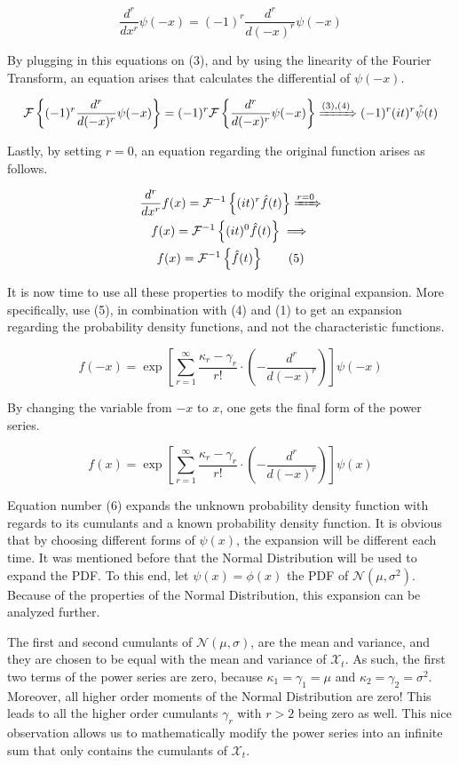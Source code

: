 \[
	\frac{d^r}{dx^r} \psi(-x) = (-1)^r \frac{d^r}{d(-x)^r} \psi(-x)
\]

By plugging in this equations on (3), and by using the linearity of the Fourier Transform, an equation arises that calculates the differential of $\psi(-x)$. 

\[
	\mathcal{F} \left\{ (-1)^r \frac{d^r}{d(-x)^r} \psi(-x) \right\} = (-1)^r \mathcal{F} \left\{ \frac{d^r}{d(-x)^r} \psi(-x) \right\} \xRightarrow{(3),(4)} (-1)^r (it)^r \hat{\psi}(t)
\]

Lastly, by setting $r=0$, an equation regarding the original function arises as follows.

\begin{gather*}
	\frac{d^r}{dx^r} f(x) = \mathcal{F}^{-1} \left\{ (it)^r \hat{f} (t) \right\} \xRightarrow[]{r=0} \\
	f(x) = \mathcal{F}^{-1} \left\{ (it)^0 \hat{f}(t) \right\} \implies \\
	f(x) = \mathcal{F}^{-1} \left\{ \hat{f}(t) \right\} \tag{5}
\end{gather*}

It is now time to use all these properties to modify the original expansion. More specifically, use (5), in combination with (4) and (1) to get an expansion regarding the probability density functions, and not the characteristic functions.

\[
	f(-x) = \exp \left[ \sum_{r=1}^{\infty} \frac{\kappa_{r} - \gamma_{r}}{r!} \cdot \left( - \frac{d^r}{d(-x)^r} \right) \right] \psi(-x)
\]

By changing the variable from $-x$ to $x$, one gets the final form of the power series.

\[
	f(x) = \exp \left[ \sum_{r=1}^{\infty} \frac{\kappa_r - \gamma_r}{r!} \cdot \left( - \frac{d^r}{d(-x)^r} \right) \right] \psi(x) \tag{6}
\]

Equation number (6) expands the unknown probability density function with regards to its cumulants and a known probability density function. It is obvious that by choosing different forms of $\psi(x)$, the expansion will be different each time. It was mentioned before that the Normal Distribution will be used to expand the PDF. To this end, let $\psi(x) = \phi(x)$ the PDF of $\mathcal{N}(\mu, \sigma^2)$. Because of the properties of the Normal Distribution, this expansion can be analyzed further.

\begin{remark}
	The first and second cumulants of $\mathcal{N}(\mu, \sigma)$, are the mean and variance, and they are chosen to be equal with the mean and variance of $\mathcal{X}_t$. As such, the first two terms of the power series are zero, because $\kappa_1 = \gamma_1 = \mu$ and $\kappa_2 = \gamma_2 = \sigma^2$. 
	Moreover, all higher order moments of the Normal Distribution are zero! This leads to all the higher order cumulants \( \gamma_r \) with \(r > 2\) being zero as well. This nice observation allows us to mathematically modify the power series into an infinite sum that only contains the cumulants of $\mathcal{X}_t$.
\end{remark}

